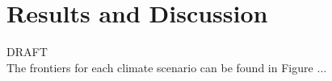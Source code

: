  
\section{Results and Discussion}
\label{sec:results}
 
DRAFT\\
The frontiers for each climate scenario can be found in Figure $\ldots$

